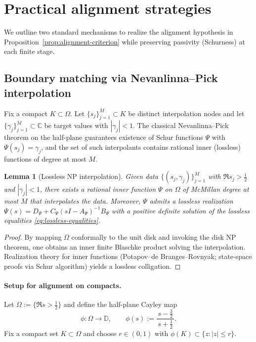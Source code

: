 \documentclass[11pt]{article}
\newtheorem{lemma}[theorem]{Lemma}
\theoremstyle{definition}
\theoremstyle{remark}
\newcommand{\C}{\mathbb{C}}
\begin{document}
\section{Practical alignment strategies}\label{sec:practical-alignment}
We outline two standard mechanisms to realize the alignment hypothesis in Proposition~\ref{prop:alignment-criterion} while preserving passivity (Schurness) at each finite stage.
\subsection{Boundary matching via Nevanlinna--Pick interpolation}
Fix a compact \(K\subset\Omega\). Let \(\{s_j\}_{j=1}^{M}\subset K\) be distinct interpolation nodes and let \(\{\gamma_j\}_{j=1}^{M}\subset\C\) be target values with \(|\gamma_j|<1\). The classical Nevanlinna--Pick theorem on the half-plane guarantees existence of Schur functions \(\Psi\) with \(\Psi(s_j)=\gamma_j\), and the set of such interpolants contains rational inner (lossless) functions of degree at most \(M\).

\begin{lemma}[Lossless NP interpolation]\label{lem:NP-lossless}
Given data \(\{(s_j,\gamma_j)\}_{j=1}^{M}\) with \(\Re s_j>\tfrac12\) and \(|\gamma_j|<1\), there exists a rational inner function \(\Psi\) on \(\Omega\) of McMillan degree at most \(M\) that interpolates the data. Moreover, \(\Psi\) admits a lossless realization \(\Psi(s)=D_\Psi+C_\Psi(sI-A_\Psi)^{-1}B_\Psi\) with a positive definite solution of the lossless equalities \eqref{eq:lossless-equalities}.
\end{lemma}
\begin{proof}
By mapping \(\Omega\) conformally to the unit disk and invoking the disk NP theorem, one obtains an inner finite Blaschke product solving the interpolation. Realization theory for inner functions (Potapov--de Branges--Rovnyak; state-space proofs via Schur algorithm) yields a lossless colligation.
\end{proof}

\paragraph{Setup for alignment on compacts.}
Let \(\Omega:=\{\Re s>\tfrac12\}\) and define the half-plane Cayley map
\[
  \phi: \Omega\to\mathbb D,\qquad \phi(s):=\frac{s-\tfrac32}{\,s+\tfrac12\,}.
\]
Fix a compact set \(K\subset\Omega\) and choose \(r\in(0,1)\) with \(\phi(K)\subset\{z:|z|\le r\}\).
\end{document}
